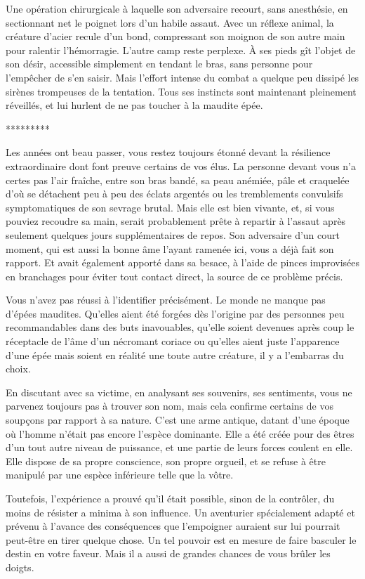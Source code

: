 \documentclass{report}
\newcommand{\ellipse}{
    \begin{center}
        *********
    \end{center}
}
\begin{document}
Une opération chirurgicale à laquelle son adversaire recourt, sans anesthésie, en sectionnant net le poignet lors d'un habile assaut. Avec un réflexe animal, la créature d'acier recule d'un bond, compressant son moignon de son autre main pour ralentir l'hémorragie. L'autre camp reste perplexe. À ses pieds gît l'objet de son désir, accessible simplement en tendant le bras, sans personne pour l'empêcher de s'en saisir. Mais l'effort intense du combat a quelque peu dissipé les sirènes trompeuses de la tentation. Tous ses instincts sont maintenant pleinement réveillés, et lui hurlent de ne pas toucher à la maudite épée.

\ellipse

Les années ont beau passer, vous restez toujours étonné devant la résilience extraordinaire dont font preuve certains de vos élus. La personne devant vous n'a certes pas l'air fraîche, entre son bras bandé, sa peau anémiée, pâle et craquelée d'où se détachent peu à peu des éclats argentés ou les tremblements convulsifs symptomatiques de son sevrage brutal. Mais elle est bien vivante, et, si vous pouviez recoudre sa main, serait probablement prête à repartir à l'assaut après seulement quelques jours supplémentaires de repos. Son adversaire d'un court moment, qui est aussi la bonne âme l'ayant ramenée ici, vous a déjà fait son rapport. Et avait également apporté dans sa besace, à l'aide de pinces improvisées en branchages pour éviter tout contact direct, la source de ce problème précis.

Vous n'avez pas réussi à l'identifier précisément. Le monde ne manque pas d'épées maudites. Qu'elles aient été forgées dès l'origine par des personnes peu recommandables dans des buts inavouables, qu'elle soient devenues après coup le réceptacle de l'âme d'un nécromant coriace ou qu'elles aient juste l'apparence d'une épée mais soient en réalité une toute autre créature, il y a l'embarras du choix.

En discutant avec sa victime, en analysant ses souvenirs, ses sentiments, vous ne parvenez toujours pas à trouver son nom, mais cela confirme certains de vos soupçons par rapport à sa nature. C'est une arme antique, datant d'une époque où l'homme n'était pas encore l'espèce dominante. Elle a été créée pour des êtres d'un tout autre niveau de puissance, et une partie de leurs forces coulent en elle. Elle dispose de sa propre conscience, son propre orgueil, et se refuse à être manipulé par une espèce inférieure telle que la vôtre.

Toutefois, l'expérience a prouvé qu'il était possible, sinon de la contrôler, du moins de résister a minima à son influence. Un aventurier spécialement adapté et prévenu à l'avance des conséquences que l'empoigner auraient sur lui pourrait peut-être en tirer quelque chose. Un tel pouvoir est en mesure de faire basculer le destin en votre faveur. Mais il a aussi de grandes chances de vous brûler les doigts.
\end{document}
